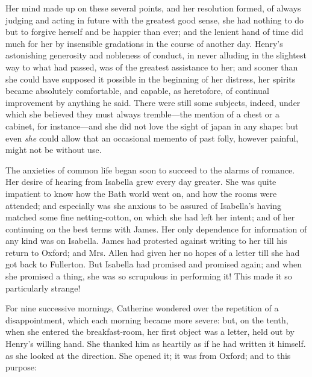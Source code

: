 Her mind made up on these several points, and her resolution formed, of always judging and acting in future with the greatest good sense, she had nothing to do but to forgive herself and be happier than ever; and the lenient hand of time did much for her by insensible gradations in the course of another day. Henry's astonishing generosity and nobleness of conduct, in never alluding in the slightest way to what had passed, was of the greatest assistance to her; and sooner than she could have supposed it possible in the beginning of her distress, her spirits became absolutely comfortable, and capable, as heretofore, of continual improvement by anything he said. There were still some subjects, indeed, under which she believed they must always tremble---the mention of a chest or a cabinet, for instance---and she did not love the sight of japan in any shape: but even {\em she} could allow that an occasional memento of past folly, however painful, might not be without use.

The anxieties of common life began soon to succeed to the alarms of romance. Her desire of hearing from Isabella grew every day greater. She was quite impatient to know how the Bath world went on, and how the rooms were attended; and especially was she anxious to be assured of Isabella's having matched some fine netting-cotton, on which she had left her intent; and of her continuing on the best terms with James. Her only dependence for information of any kind was on Isabella. James had protested against writing to her till his return to Oxford; and Mrs. Allen had given her no hopes of a letter till she had got back to Fullerton. But Isabella had promised and promised again; and when she promised a thing, she was so scrupulous in performing it! This made it so particularly strange!

For nine successive mornings, Catherine wondered over the repetition of a disappointment, which each morning became more severe: but, on the tenth, when she entered the breakfast-room, her first object was a letter, held out by Henry's willing hand. She thanked him as heartily as if he had written it himself.  as she looked at the direction. She opened it; it was from Oxford; and to this purpose:


